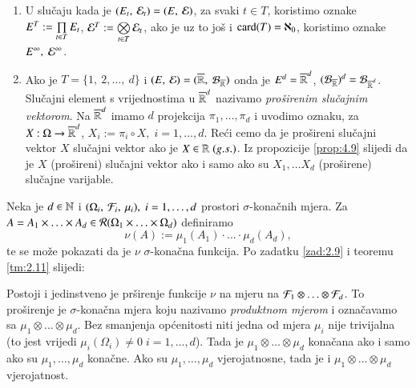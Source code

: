 \begin{nap} \label{nap:4.10}
    \begin{enumerate}[label=(\alph*)]
        \item U slu\v caju kada je $(E_t, \: \mathcal{E}_t) = (E, \: \mathcal{E})$, za svaki $t \in T$, koristimo oznake $E^T := \prod\limits_{t \in T}^{} E_t$, $\mathcal{E}^T := \bigotimes\limits_{t \in T}^{} \mathcal{E}_t$, ako je uz to jo\v s i $\textnormal{card}({T}) = \aleph_0$, koristimo oznake $E^\infty, \; \mathcal{E}^\infty$.
        \item Ako je $T = \{1, \: 2, \dots, \: d\}$ i $(E, \: \mathcal{E}) = ({\overline{\mathbb{R}}}, \: {\mathcal{B}_{\overline{\mathbb{R}}}})$ onda je $E^d = \overline{\mathbb{R}}^d$, $(\mathcal{B}_{\overline{\mathbb{R}}})^d = \mathcal{B}_{\overline{\mathbb{R}}^d}$.
        Slu\v cajni element s vrijednostima u $\overline{\mathbb{R}}^d$ nazivamo \emph{pro\v sirenim slu\v cajnim vektorom}.
        Na $\overline{\mathbb{R}}^d$ imamo $d$ projekcija $\pi_1, \dots, \pi_d$ i uvodimo oznaku, za $X : \Omega \to \overline{\mathbb{R}}^d$, $X_i := \pi_i \circ X, \; i = 1, \dots, d$.
        Re\' ci cemo da je pro\v sireni slu\v cajni vektor $X$ slu\v cajni vektor ako je $X \in \mathbb{R} \; (g.s.)$.
        Iz propozicije \ref{prop:4.9} slijedi da je $X$ (pro\v sireni) slu\v cajni vektor ako i samo ako su $X_1, \dots X_d$ (pro\v sirene) slu\v cajne varijable.
    \end{enumerate}
\end{nap}

Neka je $d \in \mathbb{N}$ i $(\Omega_i, \: \mathcal{F}_i, \: \mu_i), \; i = 1, \dots, d$ prostori $\sigma$-kona\v cnih mjera.
Za $A = A_1 \times \ldots \times A_d \in \mathcal{R}({\Omega_1 \times \ldots \times \Omega_d})$ definiramo
\begin{equation}    \label{jed:4.11}
    \nu (A) := \mu_1 (A_1) \cdot \ldots \cdot \mu_d (A_d),
\end{equation}
te se mo\v ze pokazati da je $\nu$ $\sigma$-kona\v cna funkcija.
Po zadatku \ref{zad:2.9} i teoremu \ref{tm:2.11} slijedi:

\begin{tm}  \label{tm:4.12}
    Postoji i jedinstveno je pr\v sirenje funkcije $\nu$ na mjeru na $\mathcal{F}_1 \otimes \ldots \otimes \mathcal{F}_d$.
    To pro\v sirenje je $\sigma$-kona\v cna mjera koju nazivamo \emph{produktnom mjerom} i ozna\v cavamo sa $\mu_1 \otimes \ldots \otimes \mu_d$.
    Bez smanjenja op\' cenitosti niti jedna od mjera $\mu_i$ nije trivijalna (to jest vrijedi $\mu_i (\Omega_i) \neq 0 \; i=1, \dots, d$).
    Tada je $\mu_1 \otimes \ldots \otimes \mu_d$ kona\v cana ako i samo ako su $\mu_1, \ldots, \mu_d$ kona\v cne.
    Ako su $\mu_1, \ldots, \mu_d$ vjerojatnosne, tada je i $\mu_1 \otimes \ldots \otimes \mu_d$ vjerojatnost. 
\end{tm}

